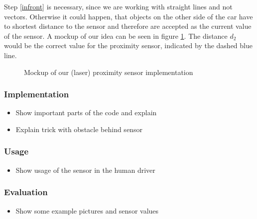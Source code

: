 \documentclass[paper=a4, fontsize=11pt]{scrreprt}
\begin{document}
Step \ref{infront} is necessary, since we are working with straight lines
and not vectors. Otherwise it could happen,
that objects on the other side of the car have to shortest distance to the sensor
and therefore are accepted as the current value of the sensor.
A mockup of our idea can be seen in figure \ref{aw_mockup}.
The distance $d_2$ would be the correct value for the proximity sensor,
indicated by the dashed blue line.

\begin{figure}[ht]\label{aw_mockup}
  \begin{center}
    \caption{Mockup of our (laser) proximity sensor implementation}
  \end{center}
\end{figure}

\subsubsection{Implementation}
\begin{itemize}
  \item Show important parts of the code and explain
  \item Explain trick with obstacle behind sensor
\end{itemize}

\subsubsection{Usage}
\begin{itemize}
  \item Show usage of the sensor in the human driver
\end{itemize}

\subsubsection{Evaluation}
\begin{itemize}
  \item Show some example pictures and sensor values
\end{itemize}
\end{document}
